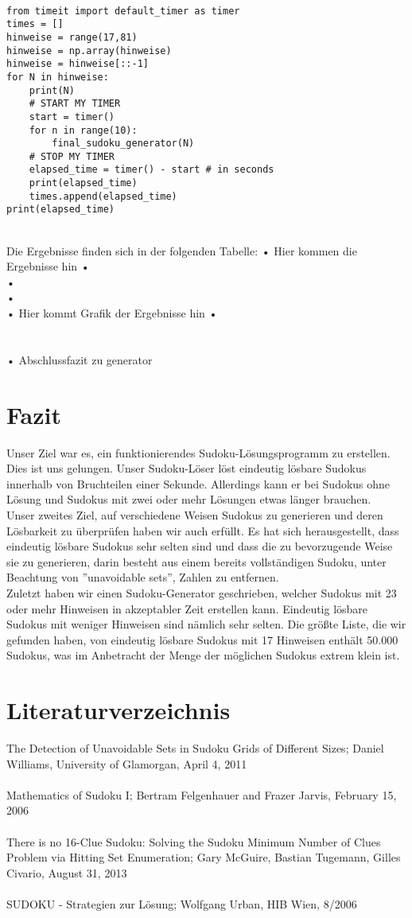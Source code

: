 \documentclass[11pt,a4paper]{article}
\begin{document}
\ \\
\begin{verbatim}
from timeit import default_timer as timer
times = []
hinweise = range(17,81)
hinweise = np.array(hinweise)
hinweise = hinweise[::-1]
for N in hinweise:
    print(N)
    # START MY TIMER
    start = timer()
    for n in range(10):
        final_sudoku_generator(N)
    # STOP MY TIMER
    elapsed_time = timer() - start # in seconds
    print(elapsed_time)
    times.append(elapsed_time)
print(elapsed_time)
\end{verbatim}
\ \\
Die Ergebnisse finden sich in der folgenden Tabelle:
\newpage
• Hier kommen die Ergebnisse hin •\\
•\\
•\\
\newpage
• Hier kommt Grafik der Ergebnisse hin •\\
\\
\\
• Abschlussfazit zu generator

\section{Fazit} 
Unser Ziel war es, ein funktionierendes Sudoku-Lösungsprogramm zu erstellen. Dies ist uns gelungen. Unser Sudoku-Löser löst eindeutig lösbare Sudokus innerhalb von Bruchteilen einer Sekunde. Allerdings kann er bei Sudokus ohne Lösung und Sudokus mit zwei oder mehr Lösungen etwas länger brauchen.\\
Unser zweites Ziel, auf verschiedene Weisen Sudokus zu generieren und deren Lösbarkeit zu überprüfen haben wir auch erfüllt. Es hat sich herausgestellt, dass eindeutig lösbare Sudokus sehr selten sind und dass die zu bevorzugende Weise sie zu generieren, darin besteht aus einem bereits vollständigen Sudoku, unter Beachtung von ''unavoidable sets'', Zahlen zu entfernen.\\
Zuletzt haben wir einen Sudoku-Generator geschrieben, welcher Sudokus mit 23 oder mehr Hinweisen in akzeptabler Zeit erstellen kann. Eindeutig lösbare Sudokus mit weniger Hinweisen sind nämlich sehr selten. Die größte Liste, die wir gefunden haben, von eindeutig lösbare Sudokus mit 17 Hinweisen enthält 50.000 Sudokus, was im Anbetracht der Menge der möglichen Sudokus extrem klein ist.

\section{Literaturverzeichnis}
The Detection of Unavoidable Sets in Sudoku Grids of Different
Sizes; Daniel Williams, University of Glamorgan, April 4, 2011\\
\ \\
Mathematics of Sudoku I; Bertram Felgenhauer and Frazer Jarvis, February 15, 2006\\
\ \\
There is no 16-Clue Sudoku: Solving the Sudoku Minimum Number of Clues Problem via Hitting Set Enumeration; Gary McGuire, Bastian Tugemann, Gilles Civario, August 31, 2013\\
\ \\
SUDOKU - Strategien zur Lösung; Wolfgang Urban, HIB Wien,  8/2006 
\end{document}
